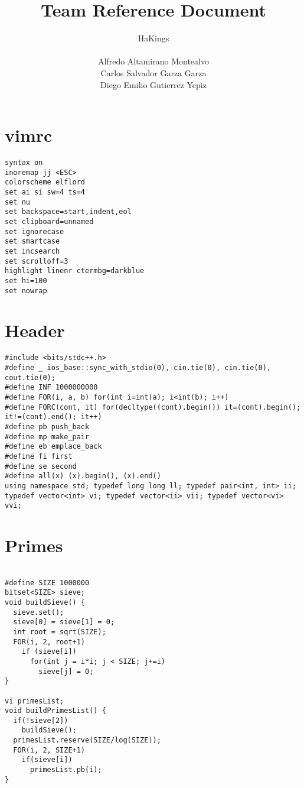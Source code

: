 \documentclass[8pt, oneside]{extarticle}
\title{Team Reference Document}
\author{HaKings\\
\\
Alfredo Altamirano Montealvo\\
Carlos Salvador Garza Garza\\
Diego Emilio Gutierrez Yepiz}
\date{}
\begin{document}
\maketitle
\fontsize{5pt}{6pt}
\newpage
\begin{multicols}{3}
\tableofcontents
\newpage

\section{vimrc}

\begin{lstlisting}
syntax on
inoremap jj <ESC>
colorscheme elflord
set ai si sw=4 ts=4
set nu
set backspace=start,indent,eol
set clipboard=unnamed
set ignorecase
set smartcase
set incsearch
set scrolloff=3
highlight linenr ctermbg=darkblue
set hi=100
set nowrap
\end{lstlisting}

\section{Header}

\begin{lstlisting}
#include <bits/stdc++.h>
#define _ ios_base::sync_with_stdio(0), cin.tie(0), cin.tie(0), cout.tie(0);
#define INF 1000000000
#define FOR(i, a, b) for(int i=int(a); i<int(b); i++)
#define FORC(cont, it) for(decltype((cont).begin()) it=(cont).begin(); it!=(cont).end(); it++)
#define pb push_back
#define mp make_pair
#define eb emplace_back
#define fi first
#define se second
#define all(x) (x).begin(), (x).end()
using namespace std; typedef long long ll; typedef pair<int, int> ii; typedef vector<int> vi; typedef vector<ii> vii; typedef vector<vi> vvi;
\end{lstlisting}

\section{Primes}
\begin{lstlisting}

#define SIZE 1000000
bitset<SIZE> sieve;
void buildSieve() {
  sieve.set();
  sieve[0] = sieve[1] = 0;
  int root = sqrt(SIZE);
  FOR(i, 2, root+1)
    if (sieve[i])
      for(int j = i*i; j < SIZE; j+=i)
        sieve[j] = 0;
}

vi primesList;
void buildPrimesList() {
  if(!sieve[2])
    buildSieve();
  primesList.reserve(SIZE/log(SIZE));
  FOR(i, 2, SIZE+1)
    if(sieve[i])
      primesList.pb(i);
}


\end{lstlisting}
\end{multicols}
\end{document}
